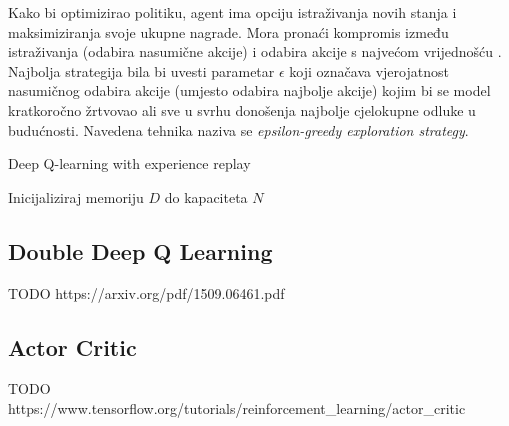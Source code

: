 Kako bi optimizirao politiku, agent ima opciju istraživanja novih stanja i maksimiziranja svoje ukupne nagrade. Mora pronaći kompromis između istraživanja (odabira nasumične akcije)  i odabira akcije s najvećom vrijednošću . Najbolja strategija bila bi uvesti parametar $\epsilon$ koji označava vjerojatnost nasumičnog odabira akcije (umjesto odabira najbolje akcije) kojim bi se model kratkoročno žrtvovao ali sve u svrhu donošenja najbolje cjelokupne odluke u budućnosti. Navedena tehnika naziva se \textit{epsilon-greedy exploration strategy}.

\begin{algorithm}
\caption{Deep Q-learning with experience replay}
\label{alg:DQL}
\begin{algorithmic}
    
    \State Inicijaliziraj memoriju $D$ do kapaciteta $N$
    \State 
    
\end{algorithmic}   
\end{algorithm}

\subsection{Double Deep Q Learning}

TODO https://arxiv.org/pdf/1509.06461.pdf

\subsection{Actor Critic}

TODO https://www.tensorflow.org/tutorials/reinforcement_learning/actor_critic
